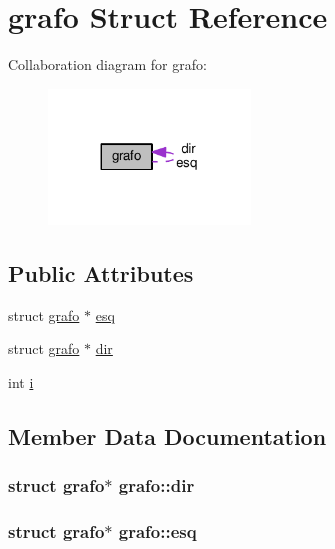 \hypertarget{structgrafo}{}\section{grafo Struct Reference}
\label{structgrafo}


Collaboration diagram for grafo\+:
\nopagebreak
\begin{figure}[H]
\begin{center}
\leavevmode
\includegraphics[width=152pt]{structgrafo__coll__graph}
\end{center}
\end{figure}
\subsection*{Public Attributes}
\begin{DoxyCompactItemize}
\item 
struct \hyperlink{structgrafo}{grafo} $\ast$ \hyperlink{structgrafo_a258a14d55dea22c0507102319671226f}{esq}
\item 
struct \hyperlink{structgrafo}{grafo} $\ast$ \hyperlink{structgrafo_acefee7ad605f204f8b1bd063adfac34c}{dir}
\item 
int \hyperlink{structgrafo_a9f3a642f8e0a5350f2a4896d3db685ee}{i}
\end{DoxyCompactItemize}


\subsection{Member Data Documentation}
\subsubsection[{\texorpdfstring{dir}{dir}}]{\setlength{\rightskip}{0pt plus 5cm}struct {\bf grafo}$\ast$ grafo\+::dir}\hypertarget{structgrafo_acefee7ad605f204f8b1bd063adfac34c}{}\label{structgrafo_acefee7ad605f204f8b1bd063adfac34c}
\subsubsection[{\texorpdfstring{esq}{esq}}]{\setlength{\rightskip}{0pt plus 5cm}struct {\bf grafo}$\ast$ grafo\+::esq}\hypertarget{structgrafo_a258a14d55dea22c0507102319671226f}{}\label{structgrafo_a258a14d55dea22c0507102319671226f}
